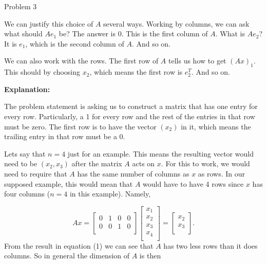 \begin{problem}{Problem 3}
\begin{highlight}[Solution]
        We can justify this choice of $A$ several ways. Working by columns, we can ask what should $Ae_{1}$ be? The answer is 0. This is the first column of $A$. What is $Ae_{2}$? It is $e_{1}$, which 
        is the second column of $A$. And so on.

        We can also work with the rows. The first row of $A$ tells us how to get $(Ax)_{1}$. This should by choosing $x_{2}$, which means the first row is $e^{T}_{2}$. And so on. \vspace*{1em}

        \noindent \textbf{Explanation:} \vspace*{1em}

        The problem statement is asking us to construct a matrix that has one entry for every row. Particularly, a 1 for every row and the rest of the entries in that row must be zero. The first row is
        to have the vector $(x_{2})$ in it, which means the trailing entry in that row must be a 0.

        Lets say that $n=4$ just for an example. This means the resulting vector would need to be $(x_{2},x_{3})$ after the matrix $A$ acts on $x$. For this to work, we would need to require that $A$ has
        the same number of columns as $x$ as rows. In our supposed example, this would mean that $A$ would have to have 4 rows since $x$ has four columns ($n = 4$ in this example). Namely,

        \setcounter{equation}{0}
        \begin{equation}
            Ax = 
            \begin{bmatrix}
                0 & 1 & 0 & 0 \\
                0 & 0 & 1 & 0 \\
            \end{bmatrix}
            \begin{bmatrix}
                x_{1} \\
                x_{2} \\
                x_{3} \\
                x_{4} \\
            \end{bmatrix}
            = 
            \begin{bmatrix}
                x_{2} \\
                x_{3} \\
            \end{bmatrix}.
        \end{equation}
        From the result in equation (1) we can see that $A$ has two less rows than it does columns. So in general the dimension of $A$ is then


\end{highlight}
\end{problem}
